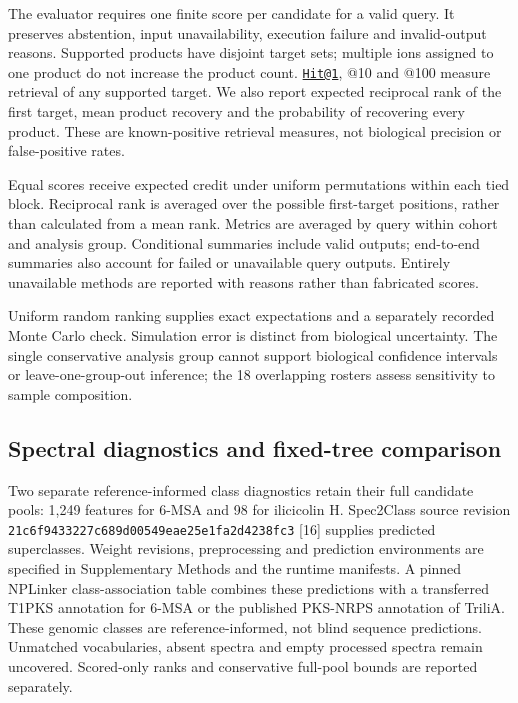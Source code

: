 \documentclass[
  10pt,
  a4paper,
]{article}
\begin{document}
The evaluator requires one finite score per candidate for a valid query. It preserves abstention, input unavailability, execution failure and invalid-output reasons. Supported products have disjoint target sets; multiple ions assigned to one product do not increase the product count. \href{mailto:Hit@1}{\nolinkurl{Hit@1}}, @10 and @100 measure retrieval of any supported target. We also report expected reciprocal rank of the first target, mean product recovery and the probability of recovering every product. These are known-positive retrieval measures, not biological precision or false-positive rates.

Equal scores receive expected credit under uniform permutations within each tied block. Reciprocal rank is averaged over the possible first-target positions, rather than calculated from a mean rank. Metrics are averaged by query within cohort and analysis group. Conditional summaries include valid outputs; end-to-end summaries also account for failed or unavailable query outputs. Entirely unavailable methods are reported with reasons rather than fabricated scores.

Uniform random ranking supplies exact expectations and a separately recorded Monte Carlo check. Simulation error is distinct from biological uncertainty. The single conservative analysis group cannot support biological confidence intervals or leave-one-group-out inference; the 18 overlapping rosters assess sensitivity to sample composition.

\subsection{Spectral diagnostics and fixed-tree comparison}\label{spectral-diagnostics-and-fixed-tree-comparison}

Two separate reference-informed class diagnostics retain their full candidate pools: 1,249 features for 6-MSA and 98 for ilicicolin H. Spec2Class source revision \nolinkurl{21c6f9433227c689d00549eae25e1fa2d4238fc3} {[}16{]} supplies predicted superclasses. Weight revisions, preprocessing and prediction environments are specified in Supplementary Methods and the runtime manifests. A pinned NPLinker class-association table combines these predictions with a transferred T1PKS annotation for 6-MSA or the published PKS-NRPS annotation of TriliA. These genomic classes are reference-informed, not blind sequence predictions. Unmatched vocabularies, absent spectra and empty processed spectra remain uncovered. Scored-only ranks and conservative full-pool bounds are reported separately.
\end{document}
